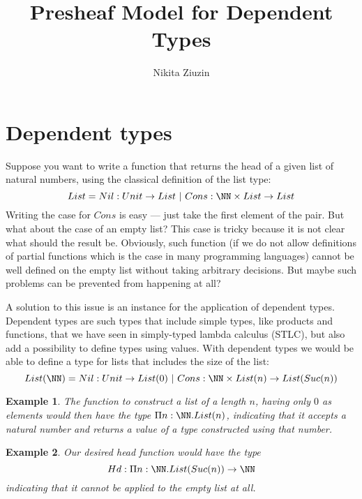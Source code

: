 \def\pathToRoot{../../}

\usepackage{todonotes}
\usepackage{semantic}
\usepackage{mathpartir}



\DeclareMathOperator{\core}{core}

\newtheorem{definition}{Definition}
\newtheorem{example}{Example}
\newtheorem{lemma}{Lemma}

\newcommand{\Fam}{\fcat{Fam}}

\title{Presheaf Model for Dependent Types}

\author{Nikita Ziuzin}



\maketitle

\section*{Dependent types}

Suppose you want to write a function that returns the head of a given list of
natural numbers, using the classical definition of the list type:
\[
  List = Nil : Unit \to List~|~Cons : \NN \times List \to List
\]
Writing the case for $Cons$ is easy --- just take the first element of the
pair.  But what about the case of an empty list? This case is tricky because it
is not clear what should the result be. Obviously, such function (if we do not
allow definitions of partial functions which is the case in many programming
languages) cannot be well defined on the empty list without taking arbitrary
decisions. But maybe such problems can be prevented from happening at all?

A solution to this issue is an instance for the application of dependent types.
Dependent types are such types that include simple types, like products and
functions, that we have seen in simply-typed lambda calculus (STLC), but also
add a possibility to define types using values. With dependent types we would
be able to define a type for lists that includes the size of the list:
\[
  List(\NN) = Nil : Unit \to List(0)~|~Cons : \NN \times List(n) \to List(Suc(n))
\]
\begin{example}
  The function to construct a list of a length $n$, having only $0$ as elements
  would then have the type $\Pi n: \NN.List(n)$, indicating that it accepts a
  natural number and returns a value of a type constructed using that number.
\end{example}
\begin{example}
  Our desired head function would have the type
  \[
    Hd: \Pi n: \NN.List(Suc(n)) \to \NN
  \]
  indicating that it cannot be applied to the empty list at all.
\end{example}

